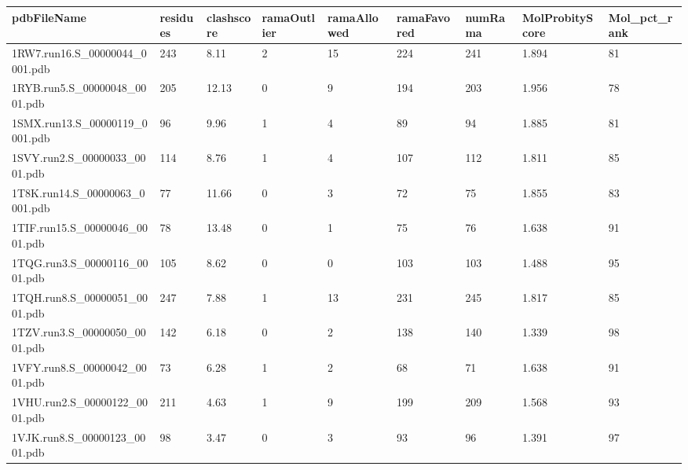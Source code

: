 \documentclass{bioinfo}
\begin{document}
\begin{table*}[!t]
{\begin{tabular}{lllllllll}\toprule
    pdbFileName             & residues & clashscore & ramaOutlier & ramaAllowed & ramaFavored & numRama & MolProbityScore & Mol\_pct\_rank \\ \midrule
    1RW7.run16.S\_00000044\_0001.pdb & 243      & 8.11       & 2           & 15          & 224         & 241     & 1.894           & 81           \\
    1RYB.run5.S\_00000048\_0001.pdb & 205      & 12.13      & 0           & 9           & 194         & 203     & 1.956           & 78           \\
    1SMX.run13.S\_00000119\_0001.pdb & 96       & 9.96       & 1           & 4           & 89          & 94      & 1.885           & 81           \\
    1SVY.run2.S\_00000033\_0001.pdb & 114      & 8.76       & 1           & 4           & 107         & 112     & 1.811           & 85           \\
    1T8K.run14.S\_00000063\_0001.pdb & 77       & 11.66      & 0           & 3           & 72          & 75      & 1.855           & 83           \\
    1TIF.run15.S\_00000046\_0001.pdb & 78       & 13.48      & 0           & 1           & 75          & 76      & 1.638           & 91           \\
    1TQG.run3.S\_00000116\_0001.pdb & 105      & 8.62       & 0           & 0           & 103         & 103     & 1.488           & 95           \\
    1TQH.run8.S\_00000051\_0001.pdb & 247      & 7.88       & 1           & 13          & 231         & 245     & 1.817           & 85           \\
    1TZV.run3.S\_00000050\_0001.pdb & 142      & 6.18       & 0           & 2           & 138         & 140     & 1.339           & 98           \\
    1VFY.run8.S\_00000042\_0001.pdb & 73       & 6.28       & 1           & 2           & 68          & 71      & 1.638           & 91           \\
    1VHU.run2.S\_00000122\_0001.pdb & 211      & 4.63       & 1           & 9           & 199         & 209     & 1.568           & 93           \\
    1VJK.run8.S\_00000123\_0001.pdb & 98       & 3.47       & 0           & 3           & 93          & 96      & 1.391           & 97           \\

\end{tabular}}
\end{table*}
\end{document}
